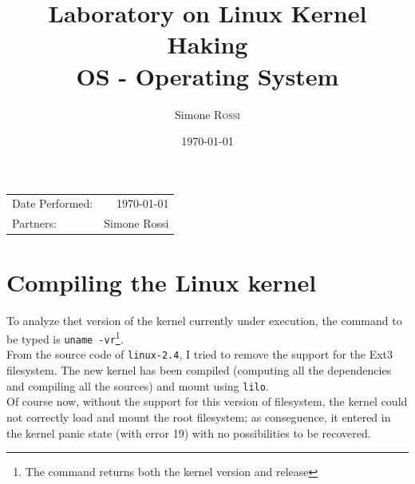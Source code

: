 \documentclass{article}
\title{Laboratory on Linux Kernel Haking\\ OS - Operating System} %
\author{Simone \textsc{Rossi}} %
\date{\today} %
\begin{document}
\maketitle %

\begin{center}
\begin{tabular}{l r}
Date Performed: & \today \\ %
Partners: & Simone Rossi \\ %
\end{tabular}
\end{center}



\section{Compiling the Linux kernel}
To analyze thet version of the kernel currently under execution, the command to be typed is 
\texttt{uname -vr}\footnote{The command returns both the kernel version and release}.\\

From the source code of \texttt{linux-2.4}, I tried to remove the support for the Ext3 
filesystem. The new kernel has been compiled (computing all the dependencies and compiling
all the sources) and mount using \texttt{lilo}.\\

Of course now, without the support for this version of filesystem, the kernel could not correctly 
load and mount the root filesystem; as conseguence, it entered in the kernel panic state (with error
19) with no possibilities to be recovered.\\
\end{document}
